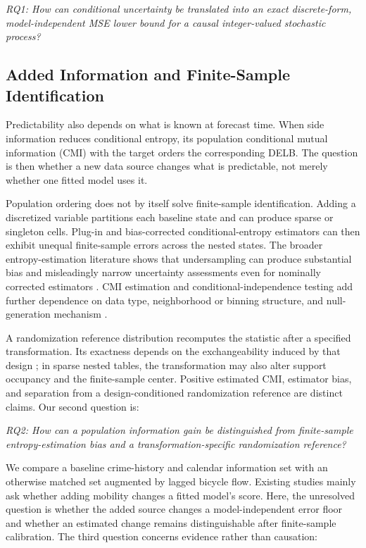 \documentclass[applsci,article,submit,moreauthors]{Definitions/mdpi}
\begin{document}
\emph{RQ1: How can conditional uncertainty be translated into an exact discrete-form,
    model-independent MSE lower bound for a causal integer-valued
    stochastic process?}

\subsection{Added Information and Finite-Sample Identification}
\label{subsec:intro_finite_sample}

Predictability also depends on what is known at forecast time. When side
information reduces conditional entropy, its population conditional mutual
information (CMI) with the target orders the corresponding DELB. The question
is then whether a new data source changes what is predictable, not merely
whether one fitted model uses it.

Population ordering does not by itself solve finite-sample identification.
Adding a discretized variable partitions each baseline state and can produce
sparse or singleton cells. Plug-in and bias-corrected conditional-entropy
estimators can then exhibit unequal finite-sample errors across the nested
states. The broader entropy-estimation literature shows that undersampling can
produce substantial bias and misleadingly narrow uncertainty assessments even
for nominally corrected estimators \citep{paninski2003,calcagnile2026benchmark}.
CMI estimation and conditional-independence testing add further dependence on
data type, neighborhood or binning structure, and null-generation mechanism
\citep{zan2022cmi,runge2018cmi,li2023nncit}.

A randomization reference distribution recomputes the statistic after a
specified transformation. Its exactness depends on the
exchangeability induced by that design \citep{ernst2004permutation}; in sparse
nested tables, the transformation may also alter support occupancy and the
finite-sample center. Positive estimated CMI, estimator bias, and separation
from a design-conditioned randomization reference are distinct
claims. Our second question is:

\emph{RQ2: How can a population information gain be distinguished from
finite-sample entropy-estimation bias and a transformation-specific
randomization reference?}

We compare a baseline crime-history and calendar
information set with an otherwise matched set augmented by lagged bicycle
flow. Existing studies mainly ask whether adding mobility changes a fitted
model's score. Here, the unresolved question is whether the added
source changes a model-independent error floor and whether an estimated change
remains distinguishable after finite-sample calibration. The third question
concerns evidence rather than causation:
\end{document}
